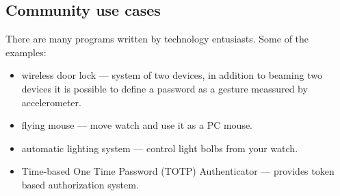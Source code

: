 \subsection{Community use cases}
There are many programs written by technology entusiasts. Some of the examples:

\begin{itemize}
  \item wireless door lock --- system of two devices, in addition to beaming two devices it is possible to define a password as a gesture meassured by accelerometer.
  \item flying mouse --- move watch and use it as a PC mouse.
  \item automatic lighting system --- control light bolbs from your watch.
  \item Time-based One Time Password (TOTP) Authenticator --- provides token based authorization system.
\end{itemize}



